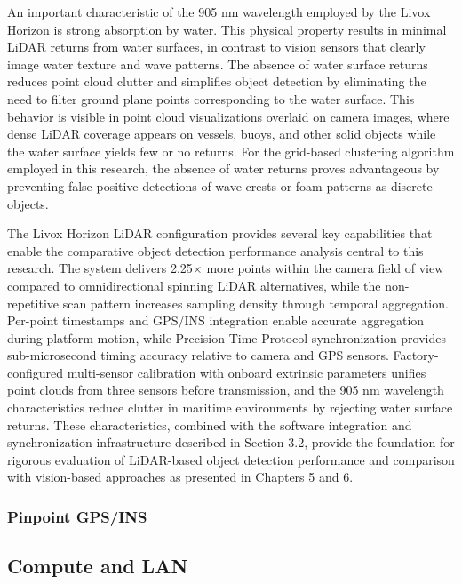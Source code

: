 \documentclass{erauthesis}
\begin{document}
An important characteristic of the 905 nm wavelength employed by the Livox Horizon is strong absorption by water.
This physical property results in minimal \ac{LiDAR} returns from water surfaces, in contrast to vision sensors that clearly image water texture and wave patterns.
The absence of water surface returns reduces point cloud clutter and simplifies object detection by eliminating the need to filter ground plane points corresponding to the water surface.
This behavior is visible in point cloud visualizations overlaid on camera images, where dense \ac{LiDAR} coverage appears on vessels, buoys, and other solid objects while the water surface yields few or no returns.
For the grid-based clustering algorithm employed in this research, the absence of water returns proves advantageous by preventing false positive detections of wave crests or foam patterns as discrete objects.

The Livox Horizon \ac{LiDAR} configuration provides several key capabilities that enable the comparative object detection performance analysis central to this research.
The system delivers 2.25× more points within the camera field of view compared to omnidirectional spinning \ac{LiDAR} alternatives, while the non-repetitive scan pattern increases sampling density through temporal aggregation.
Per-point timestamps and \ac{GPS}/\ac{INS} integration enable accurate aggregation during platform motion, while Precision Time Protocol synchronization provides sub-microsecond timing accuracy relative to camera and \ac{GPS} sensors.
Factory-configured multi-sensor calibration with onboard extrinsic parameters unifies point clouds from three sensors before transmission, and the 905 nm wavelength characteristics reduce clutter in maritime environments by rejecting water surface returns.
These characteristics, combined with the software integration and synchronization infrastructure described in Section 3.2, provide the foundation for rigorous evaluation of \ac{LiDAR}-based object detection performance and comparison with vision-based approaches as presented in Chapters 5 and 6.

            \subsubsection{Pinpoint GPS/INS}
            
        \subsection{Compute and LAN}
        
\end{document}
